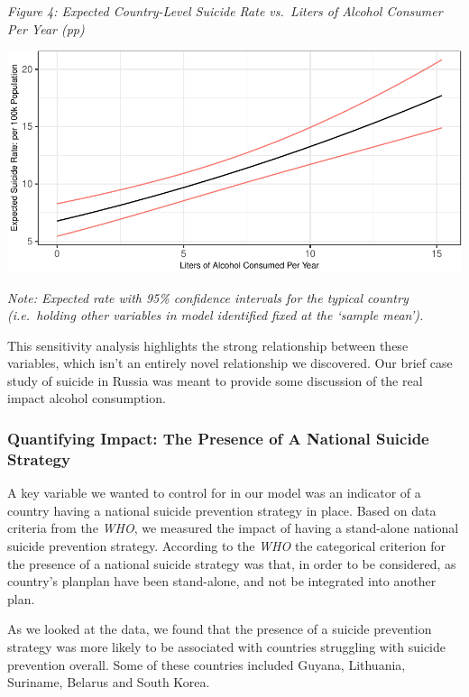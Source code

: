 \documentclass[]{article}
\begin{document}
\emph{Figure 4: Expected Country-Level Suicide Rate vs.~Liters of
Alcohol Consumer Per Year (pp)}

\begin{center}\includegraphics{Project_Report_files/figure-latex/a_alc_plot-1} \end{center}

\emph{Note: Expected rate with 95\% confidence intervals for the typical
country (i.e.~holding other variables in model identified fixed at the
`sample mean').}

This sensitivity analysis highlights the strong relationship between
these variables, which isn't an entirely novel relationship we
discovered. Our brief case study of suicide in Russia was meant to
provide some discussion of the real impact alcohol consumption.

\subsubsection{Quantifying Impact: The Presence of A National Suicide
Strategy}\label{quantifying-impact-the-presence-of-a-national-suicide-strategy}

A key variable we wanted to control for in our model was an indicator of
a country having a national suicide prevention strategy in place. Based
on data criteria from the \emph{WHO}, we measured the impact of having a
stand-alone national suicide prevention strategy. According to the
\emph{WHO} the categorical criterion for the presence of a national
suicide strategy was that, in order to be considered, as country's
planplan have been stand-alone, and not be integrated into another plan.

As we looked at the data, we found that the presence of a suicide
prevention strategy was more likely to be associated with countries
struggling with suicide prevention overall. Some of these countries
included Guyana, Lithuania, Suriname, Belarus and South Korea.
\end{document}

